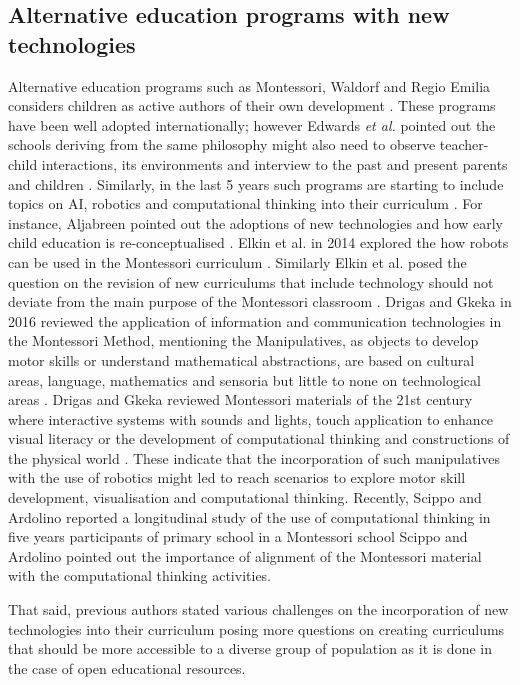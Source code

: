 \documentclass[conference]{IEEEtran}
\newcommand{\etal}{\textit{et al. }} %
\begin{document}
\subsection{Alternative education programs with new technologies}
Alternative education programs such as Montessori, Waldorf and Regio Emilia considers children as active authors of their own development \cite{edwards2002}.
These programs have been well adopted internationally; however Edwards \etal pointed out the schools deriving from the same philosophy might also need to observe teacher-child interactions, its environments and interview to the past and present parents and children \cite{edwards2002}.
Similarly, in the last 5 years such programs are starting to include topics on AI, robotics and computational thinking into their curriculum \cite{elkin2014, Aljabreen2020}.
For instance, Aljabreen pointed out the adoptions of new technologies and how early child education is re-conceptualised \cite{Aljabreen2020}. 
Elkin et al. in 2014 explored the how robots can be used in the Montessori curriculum \cite{elkin2014}.
Similarly Elkin et al. posed the question on the revision of new curriculums that include technology should not deviate from the main purpose of the Montessori classroom \cite{elkin2014}.
Drigas and Gkeka in 2016 reviewed the application of information and communication technologies in the Montessori Method, mentioning the Manipulatives, as objects to develop motor skills or understand mathematical abstractions, are based on cultural areas, language, mathematics and sensoria but little to none on technological areas \cite{DrigasGkeka2016}.
Drigas and Gkeka reviewed Montessori materials of the 21st century where interactive systems with sounds and lights, touch application to enhance visual literacy or the development of computational thinking and constructions of the physical world \cite{DrigasGkeka2016}.
These indicate that the incorporation of such manipulatives with the use of robotics might led to reach scenarios to explore motor skill development, visualisation and computational thinking. 
Recently, Scippo and Ardolino reported a longitudinal study of the use of computational thinking in five years participants of primary school in a Montessori school \cite{ScippoArdolino2021}
Scippo and Ardolino pointed out the importance of alignment of the Montessori material with the computational thinking activities. 

That said, previous authors stated various challenges on the incorporation of new technologies into their curriculum posing more questions on creating curriculums that should be more accessible to a diverse group of population as it is done in the case of open educational resources.
\end{document}
